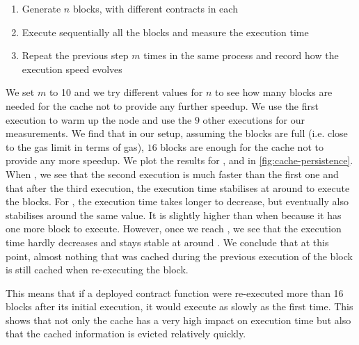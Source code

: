 \begin{enumerate}
	\item Generate $n$ blocks, with different contracts in each
	\item Execute sequentially all the blocks and measure the execution time
	\item Repeat the previous step $m$ times in the same process and record how the execution speed evolves
\end{enumerate}

We set $m$ to 10 and we try different values for $n$ to see how many blocks are needed for the cache not to provide any further speedup.
We use the first execution to warm up the node and use the $9$ other executions for our measurements.
We find that in our setup, assuming the blocks are full (i.e. close to the gas limit in terms of gas), $16$ blocks are enough for the cache not to provide any more speedup.
We plot the results for ,  and  in \autoref{fig:cache-persistence}.
When , we see that the second execution is much faster than the first one and that after the third execution, the execution time stabilises at around  to execute the  blocks. For , the execution time takes longer to decrease, but eventually also stabilises around the same value. It is slightly higher than when  because it has one more block to execute.
However, once we reach , we see that the execution time hardly decreases and stays stable at around . We conclude that at this point, almost nothing that was cached during the previous execution of the block is still cached when re-executing the block.

This means that if a deployed contract function were re-executed more than 16 blocks after its initial execution, it would execute as slowly as the first time.
This shows that not only the cache has a very high impact on execution time but also that the cached information is evicted relatively quickly.

